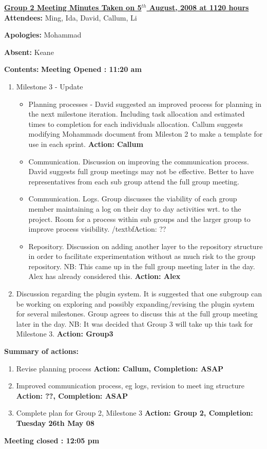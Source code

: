 \documentclass{letter}
\begin{document}
 
{\large \textbf{\underline{Group 2 Meeting Minutes Taken on 5$^{th}$ August, 2008 at 1120 hours}}}\\
 
\textbf{Attendees:} Ming, Ida, David, Callum, Li

\textbf{Apologies:} Mohammad
 
\textbf{Absent:} Keane
 
\textbf{Contents:}
 \textbf{Meeting Opened : 11:20 am }
\begin{enumerate}
\item Milestone 3 - Update
	\begin{itemize}
	\item Planning processes - David suggested an improved process for planning in
	the next milestone iteration. Including task allocation and estimated times to completion for each
	individuals allocation. Callum suggests modifying Mohammads document from
	Mileston 2 to make a template for use in each sprint. \textbf{Action: Callum}
	\item Communication. Discussion on improving the communication process. David
	suggests full group meetings may not be effective. Better to have
	representatives from each sub group attend the full group meeting.
	\item Communication. Logs. Group discusses the viability of each group member
	maintaining a log on their day to day activities wrt. to the project. Room for
	a process within sub groups and the larger group to improve process
	visibility. /textbf{Action: ??}
	\item Repository. Discussion on adding another layer to the repository
	structure in order to facilitate experimentation without as much risk to the
	group repository. NB: This came up in the full group meeting later in the day.
	Alex has already considered this. \textbf{Action: Alex}
    \end{itemize}
\item Discussion regarding the plugin system. It is suggested that one
	subgroup can be working on exploring and possibly expanding/revising the plugin
	system for several milestones. Group agrees to discuss this at the full group
	meeting later in the day. NB: It was decided that Group 3 will take up this
	task for Milestone 3. \textbf{Action: Group3}
\end{enumerate}

\textbf{Summary of actions:}
\begin{enumerate}
  \item Revise planning process \textbf{Action: Callum, Completion: ASAP}
  \item Improved communication process, eg logs, revision to meet
 ing structure \textbf{Action: ??, Completion: ASAP}
  \item Complete plan for Group 2, Milestone 3 \textbf{Action: Group 2,
  Completion: Tuesday 26th May 08}
\end{enumerate}

\textbf{Meeting closed : 12:05 pm }
\end{document}
